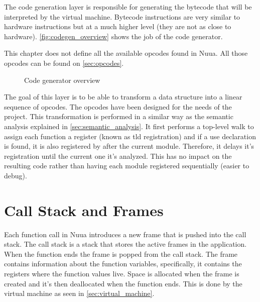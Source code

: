 The code generation layer is responsible for generating the bytecode that will be interpreted by the virtual machine.
Bytecode instructions are very similar to hardware instructions but at a much higher level (they are not as close to hardware).
\autoref{fig:codegen_overview} shows the job of the code generator.

This chapter does not define all the available opcodes found in Nuua. All those opcodes can be found on \autoref{sec:opcodes}.

\begin{figure}[H]
    \centering

    \caption{Code generator overview}
    \label{fig:codegen_overview}
\end{figure}

The goal of this layer is to be able to transform a data structure into a linear sequence of opcodes. The opcodes have been designed
for the needs of the project. This transformation is performed in a similar way as the semantic analysis explained in \autoref{sec:semantic_analysis}.
It first performs a top-level walk to assign each function a register (known as tld registration) and if a use declaration is found, it is also
registered by after the current module. Therefore, it delays it's registration until the current one it's analyzed. This has no impact on the resulting code
rather than having each module registered sequentially (easier to debug).

\section{Call Stack and Frames}
\label{sec:call_stack}

Each function call in Nuua introduces a new frame that is pushed into the call stack. The call stack is a stack that stores the active frames in the application.
When the function ends the frame is popped from the call stack. The frame contains information about the function variables, specifically, it contains the registers
where the function values live. Space is allocated when the frame is created and it's then deallocated when the function ends. This is done by the
virtual machine as seen in \autoref{sec:virtual_machine}.

